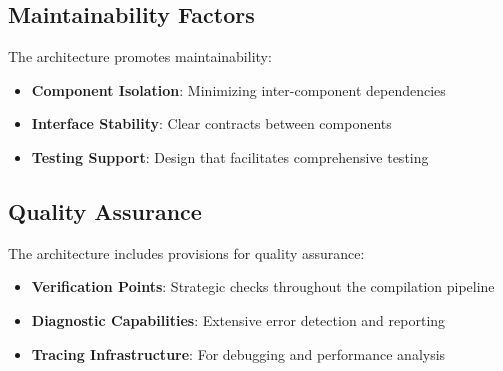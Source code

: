 \documentclass[12pt,a4paper]{article}
\begin{document}
\subsection{Maintainability Factors}

The architecture promotes maintainability:

\begin{itemize}
    \item \textbf{Component Isolation}: Minimizing inter-component dependencies
    \item \textbf{Interface Stability}: Clear contracts between components
    \item \textbf{Testing Support}: Design that facilitates comprehensive testing
\end{itemize}

\subsection{Quality Assurance}

The architecture includes provisions for quality assurance:

\begin{itemize}
    \item \textbf{Verification Points}: Strategic checks throughout the compilation pipeline
    \item \textbf{Diagnostic Capabilities}: Extensive error detection and reporting
    \item \textbf{Tracing Infrastructure}: For debugging and performance analysis
\end{itemize}
\end{document}
